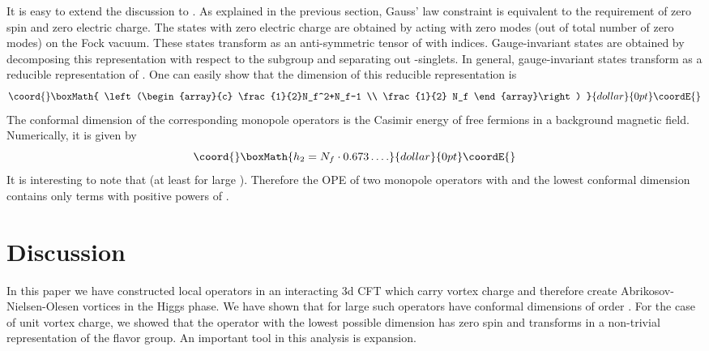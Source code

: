 \documentclass[a4paper,12pt, amsfonts, amssymb]{article}
\begin{document}
It is easy to extend the discussion to \coordHE{}. As explained in the
previous section, Gauss' law constraint is equivalent to the requirement
of zero spin and zero electric charge. The states with zero
electric charge are obtained by acting with \coordHE{} zero modes (out of total
number of \coordHE{} zero modes) on the Fock vacuum. These states transform
as an anti-symmetric tensor of \coordHE{} with \coordHE{} indices.
Gauge-invariant states are obtained by decomposing this representation
with respect to the \coordHE{} subgroup and separating
out \coordHE{}-singlets. In general, gauge-invariant states transform
as a reducible representation of \coordHE{}. One can easily show that
the dimension of this reducible representation is 
$$\coord{}\boxMath{
\left(\begin{array}{c} \frac{1}{2}N_f^2+N_f-1 \\ \frac{1}{2} N_f \end{array}\right)
}{dollar}{0pt}\coordE{}$$
The conformal dimension
of the corresponding monopole operators is the Casimir energy of
free fermions in a background magnetic field. Numerically, it is
given by
$$\coord{}\boxMath{
h_2=N_f\cdot 0.673\ldots.
}{dollar}{0pt}\coordE{}$$
It is interesting to note that \coordHE{} (at least for large \coordHE{}).
Therefore the
OPE of two monopole operators with \coordHE{} and the lowest conformal dimension contains only terms with positive powers of \coordHE{}. 


\section{Discussion}

In this paper we have constructed local operators in an interacting
3d CFT which carry vortex charge and therefore create 
Abrikosov-Nielsen-Olesen vortices in the Higgs phase. We have shown that 
for large \coordHE{} such operators have conformal dimensions of order \coordHE{}. For the case of unit vortex charge, we showed that the operator with the
lowest possible dimension has zero spin and transforms in a non-trivial
representation of the flavor group. An important tool in this analysis
is \coordHE{} expansion. 
\end{document}
